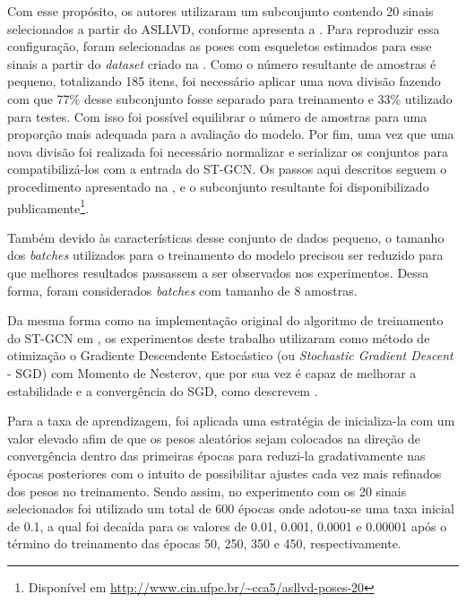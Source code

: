 Com esse propósito, os autores utilizaram um subconjunto contendo 20 sinais selecionados a partir do ASLLVD, conforme apresenta a . Para reproduzir essa configuração, foram selecionadas as poses com esqueletos estimados para esse sinais a partir do \textit{dataset} criado na . Como o número resultante de amostras é pequeno, totalizando 185 itens, foi necessário aplicar uma nova divisão fazendo com que 77\% desse subconjunto fosse separado para treinamento e 33\% utilizado para testes. Com isso foi possível equilibrar o número de amostras para uma proporção mais adequada para a avaliação do modelo. Por fim, uma vez que uma nova divisão foi realizada foi necessário normalizar e serializar os conjuntos para compatibilizá-los com a entrada do ST-GCN. Os passos aqui descritos seguem o procedimento apresentado na , e o subconjunto resultante foi disponibilizado publicamente\footnote{
    Disponível em \url{http://www.cin.ufpe.br/~cca5/asllvd-poses-20}
}.

Também devido às características desse conjunto de dados pequeno, o tamanho dos \textit{batches} utilizados para o treinamento do modelo precisou ser reduzido para que melhores resultados passassem a ser observados nos experimentos. Dessa forma, foram considerados \textit{batches} com tamanho de 8 amostras.

Da mesma forma como na implementação original do algoritmo de treinamento do ST-GCN em \cite{st-gcn-2018}, os experimentos deste trabalho utilizaram como método de otimização o Gradiente Descendente Estocástico (ou \textit{Stochastic Gradient Descent} - SGD) com Momento de Nesterov, que por sua vez é capaz de melhorar a estabilidade e a convergência do SGD, como descrevem \cite{stanford-2018, bengio-2013, sutskever-2013}.

Para a taxa de aprendizagem, foi aplicada uma estratégia de inicializa-la com um valor elevado afim de que os pesos aleatórios sejam colocados na direção de convergência dentro das primeiras épocas para reduzi-la gradativamente nas épocas posteriores com o intuito de possibilitar ajustes cada vez mais refinados dos pesos no treinamento. Sendo assim, no experimento com os 20 sinais selecionados foi utilizado um total de 600 épocas onde adotou-se uma taxa inicial de 0.1, a qual foi decaída para os valores de 0.01, 0.001, 0.0001 e 0.00001 após o término do treinamento das épocas 50, 250, 350 e 450, respectivamente. 




